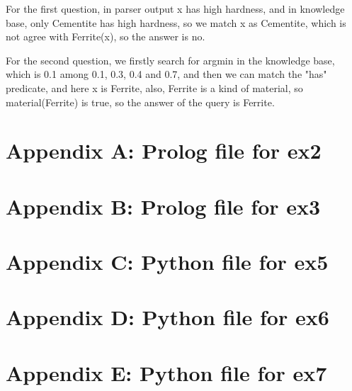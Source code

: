 \documentclass[12pt]{article}
\begin{document}
{\begin{enumerate}[1.]
    For the first question, in parser output x has high hardness, and in knowledge base, 
    only Cementite has high hardness, so we match x as Cementite, which is not agree with 
    Ferrite(x), so the answer is no.

    For the second question, we firstly search for argmin in the knowledge base, which is 0.1 among 
    0.1, 0.3, 0.4 and 0.7, and then we can match the "has" predicate, and here x is Ferrite, also, 
    Ferrite is a kind of material, so material(Ferrite) is true, so the answer of the query is Ferrite.
\end{enumerate}

\newpage
\section{Appendix A: Prolog file for ex2}
\label{sec: AppendixA}


\section{Appendix B: Prolog file for ex3}
\label{sec: AppendixB}


\section{Appendix C: Python file for ex5}
\label{sec: AppendixC}


\section{Appendix D: Python file for ex6}
\label{sec: AppendixD}


\section{Appendix E: Python file for ex7}
\label{sec: AppendixD}



}
\end{document}
